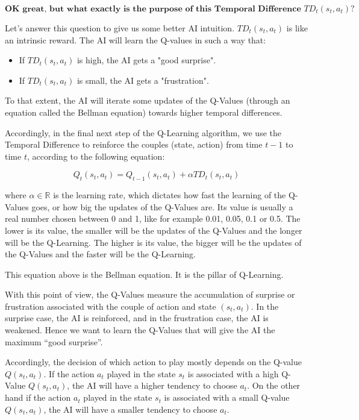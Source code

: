 \documentclass[]{book}
\begin{document}
\begin{equation*}
\textbf{OK great, but what exactly is the purpose of this Temporal Difference $TD_t(s_t,a_t)$?}
\end{equation*}

Let's answer this question to give us some better AI intuition. \(TD_t(s_t,a_t)\) is like an intrinsic reward. The AI will learn the Q-values in such a way that:

\begin{itemize}
\item If $TD_t(s_t,a_t)$ is high, the AI gets a "good surprise".
\item If $TD_t(s_t,a_t)$ is small, the AI gets a "frustration".
\end{itemize}

To that extent, the AI will iterate some updates of the Q-Values (through an equation called the Bellman equation) towards higher temporal differences.

Accordingly, in the final next step of the Q-Learning algorithm, we use the Temporal Difference to reinforce the couples (state, action) from time \(t-1\) to time \(t\), according to the following equation:

\begin{equation*}
Q_t(s_t,a_t) = Q_{t-1}(s_t,a_t) + \alpha TD_t(s_t,a_t)
\end{equation*}

where \(\alpha \in \mathbb{R}\) is the learning rate, which dictates how fast the learning of the Q-Values goes, or how big the updates of the Q-Values are. Its value is usually a real number chosen between 0 and 1, like for example 0.01, 0.05, 0.1 or 0.5. The lower is its value, the smaller will be the updates of the Q-Values and the longer will be the Q-Learning. The higher is its value, the bigger will be the updates of the Q-Values and the faster will be the Q-Learning.

This equation above is the Bellman equation. It is the pillar of Q-Learning.

With this point of view, the Q-Values measure the accumulation of surprise or frustration associated with the couple of action and state \((s_t,a_t)\). In the surprise case, the AI is reinforced, and in the frustration case, the AI is weakened. Hence we want to learn the Q-Values that will give the AI the maximum ``good surprise''.

Accordingly, the decision of which action to play mostly depends on the Q-value \(Q(s_t, a_t)\). If the action \(a_t\) played in the state \(s_t\) is associated with a high Q-Value \(Q(s_t,a_t)\), the AI will have a higher tendency to choose \(a_t\). On the other hand if the action \(a_t\) played in the state \(s_t\) is associated with a small Q-value \(Q(s_t, a_t)\), the AI will have a smaller tendency to choose \(a_t\).
\end{document}
